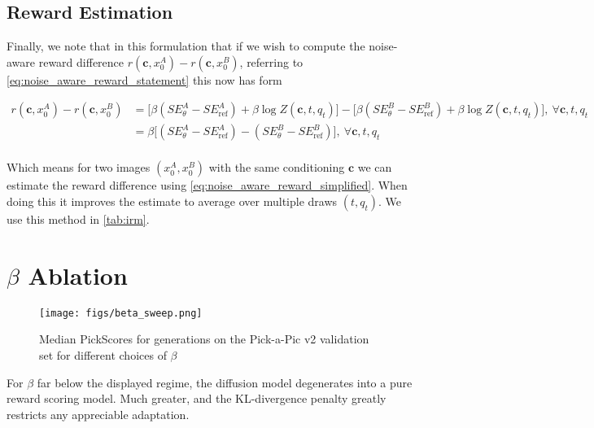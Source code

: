 \documentclass[10pt,twocolumn,letterpaper]{article}
\newcommand{\vc}{\ensuremath{\boldsymbol{c}}}
\begin{document}
\subsection{Reward Estimation}\label{sec:reward_estimation_supp}

Finally, we note that in this formulation that if we wish to compute the noise-aware reward difference $r(\vc, x^A_0) - r(\vc, x^B_0)$, referring to \cref{eq:noise_aware_reward_statement} this now has form

\begin{align}\label{eq:noise_aware_reward_simplified}
    r(\vc, x^A_0) - r(\vc, x^B_0)  & = \bigl[ \beta (SE^A_\theta - SE^A_\text{ref}) + \beta \log Z(\vc, t, q_t)\bigr] -  \bigl[ \beta (SE^B_\theta - SE^B_\text{ref}) + \beta \log Z(\vc, t, q_t)\bigr],\ \forall \vc, t, q_t \\
    & = \beta \bigl[(SE^A_\theta - SE^A_\text{ref}) - (SE^B_\theta - SE^B_\text{ref}) \bigr],\ \forall \vc, t, q_t \\
\end{align}

Which means for two images $(x_0^A,x_0^B)$ with the same conditioning $\vc$ we can estimate the reward difference using \cref{eq:noise_aware_reward_simplified}. When doing this it improves the estimate to average over multiple draws $(t, q_t)$. We use this method in \cref{tab:irm}.





















\section{$\beta$ Ablation}\label{sec:beta_sweep}


\begin{figure}[h]
  \centering
   \texttt{[image: figs/beta\_sweep.png]}

   \caption{Median PickScores for generations on the Pick-a-Pic v2 validation set for different choices of $\beta$}
   \label{fig:beta_sweep}
\end{figure}

For $\beta$ far below the displayed regime, the diffusion model degenerates into a pure reward scoring model. Much greater, and the KL-divergence penalty greatly restricts any appreciable adaptation.
\end{document}
